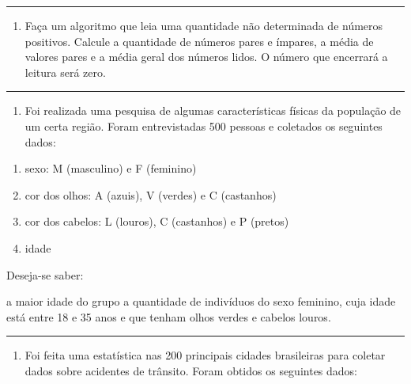 \documentclass[12pt,a4paper]{article}
\providecommand{\tightlist}{%
      \setlength{\itemsep}{0pt}\setlength{\parskip}{0pt}}
\begin{document}
    \begin{center}\rule{0.5\linewidth}{0.5pt}\end{center}

\begin{enumerate}
\def\labelenumi{\arabic{enumi}.}
\setcounter{enumi}{9}
\tightlist
\item
  Faça um algoritmo que leia uma quantidade não determinada de números
  positivos. Calcule a quantidade de números pares e ímpares, a média de
  valores pares e a média geral dos números lidos. O número que
  encerrará a leitura será zero.
\end{enumerate}

    \begin{center}\rule{0.5\linewidth}{0.5pt}\end{center}

\begin{enumerate}
\def\labelenumi{\arabic{enumi}.}
\setcounter{enumi}{10}
\tightlist
\item
  Foi realizada uma pesquisa de algumas características físicas da
  população de um certa região. Foram entrevistadas 500 pessoas e
  coletados os seguintes dados:
\end{enumerate}

\begin{enumerate}
\def\labelenumi{\alph{enumi})}
\item
  sexo: M (masculino) e F (feminino)
\item
  cor dos olhos: A (azuis), V (verdes) e C (castanhos)
\item
  cor dos cabelos: L (louros), C (castanhos) e P (pretos)
\item
  idade
\end{enumerate}

Deseja-se saber:

a maior idade do grupo a quantidade de indivíduos do sexo feminino, cuja
idade está entre 18 e 35 anos e que tenham olhos verdes e cabelos
louros.

    \begin{center}\rule{0.5\linewidth}{0.5pt}\end{center}

\begin{enumerate}
\def\labelenumi{\arabic{enumi}.}
\setcounter{enumi}{11}
\tightlist
\item
  Foi feita uma estatística nas 200 principais cidades brasileiras para
  coletar dados sobre acidentes de trânsito. Foram obtidos os seguintes
  dados:
\end{enumerate}
\end{document}
